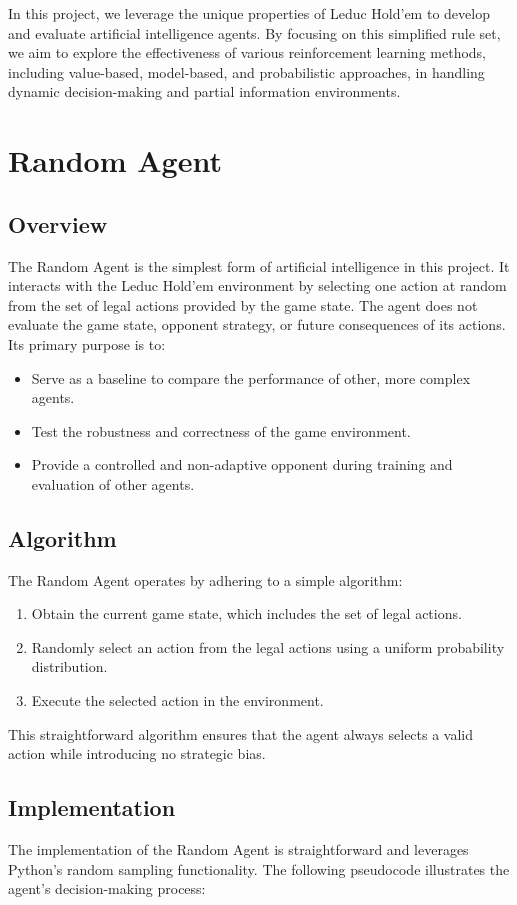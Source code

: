 \documentclass{article}
\begin{document}
In this project, we leverage the unique properties of Leduc Hold'em to develop and evaluate artificial intelligence agents. By focusing on this simplified rule set, we aim to explore the effectiveness of various reinforcement learning methods, including value-based, model-based, and probabilistic approaches, in handling dynamic decision-making and partial information environments.


\section{Random Agent}
\subsection{Overview}
The Random Agent is the simplest form of artificial intelligence in this project. It interacts with the Leduc Hold’em environment by selecting one action at random from the set of legal actions provided by the game state. The agent does not evaluate the game state, opponent strategy, or future consequences of its actions. Its primary purpose is to:
\begin{itemize}
    \item Serve as a baseline to compare the performance of other, more complex agents.
    \item Test the robustness and correctness of the game environment.
    \item Provide a controlled and non-adaptive opponent during training and evaluation of other agents.
\end{itemize}

\subsection{Algorithm}
The Random Agent operates by adhering to a simple algorithm:
\begin{enumerate}
    \item Obtain the current game state, which includes the set of legal actions.
    \item Randomly select an action from the legal actions using a uniform probability distribution.
    \item Execute the selected action in the environment.
\end{enumerate}

This straightforward algorithm ensures that the agent always selects a valid action while introducing no strategic bias.

\subsection{Implementation}
The implementation of the Random Agent is straightforward and leverages Python's random sampling functionality. The following pseudocode illustrates the agent's decision-making process:
\end{document}
